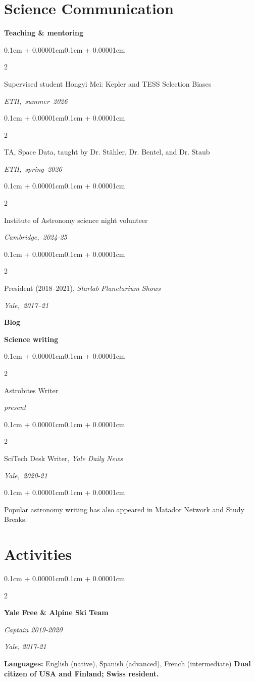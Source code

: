 \documentclass[10pt,letterpaper]{article}
\newenvironment{onecolentry}{
    \begin{adjustwidth}{0.1cm + 0.00001cm}{0.1cm + 0.00001cm}
}{
    \end{adjustwidth}
}
\newenvironment{twocolentry}[2][]{
    \onecolentry
    \def\secondColumn{#2}
    \setcolumnwidth{\fill,4.5cm}
    \begin{paracol}{2}
}{
    \switchcolumn \raggedleft \secondColumn
    \end{paracol}
    \endonecolentry
}
\begin{document}

    \section{Science Communication}    
    
    \textbf{Teaching \& mentoring}
    \begin{twocolentry}{\mbox{\textit{ETH, summer 2026}}}
        Supervised student Hongyi Mei: Kepler and TESS Selection Biases	
    \end{twocolentry}
    \begin{twocolentry}{\mbox{\textit{ETH, spring 2026}}}
        TA, Space Data, taught by Dr. Stähler, Dr. Bentel, and Dr. Staub
    \end{twocolentry}
    \begin{twocolentry}{\mbox{\textit{Cambridge, 2024-25}}}
        Institute of Astronomy science night volunteer
    \end{twocolentry}
    \begin{twocolentry}{\mbox{\textit{Yale, 2017–21}}}
        President (2018–2021), \textit{Starlab Planetarium Shows}
    \end{twocolentry}
    \vspace{0.20 cm}
    
    \vspace{0.20 cm}
    \textbf{Blog}
    
    \vspace{0.10 cm}
    \textbf{Science writing}
    \begin{twocolentry}{\mbox{\textit{present}}}
        Astrobites Writer
    \end{twocolentry}
    \begin{twocolentry}{\mbox{\textit{Yale, 2020-21}}}
        SciTech Desk Writer, \textit{Yale Daily News}
    \end{twocolentry}
    \begin{onecolentry}
        {\color{black}Popular astronomy writing has also appeared in Matador Network and Study Breaks.}
    \end{onecolentry}

    \vspace{0.1 cm}


    \section{Activities}    


    \vspace{0.10 cm}
    \begin{twocolentry}{
        \textit{Yale, 2017-21} }
        \textbf{Yale Free \& Alpine Ski Team}
            
        \textit{Captain 2019-2020}
    \end{twocolentry}
    \vspace{0.10 cm}
    \vspace{0.10 cm}
    \textbf{Languages:} English (native), Spanish (advanced), French (intermediate)     
    \vspace{0.10 cm}   
    \newline
    \textbf{Dual citizen of USA and Finland; Swiss resident.}

        
\end{document}
